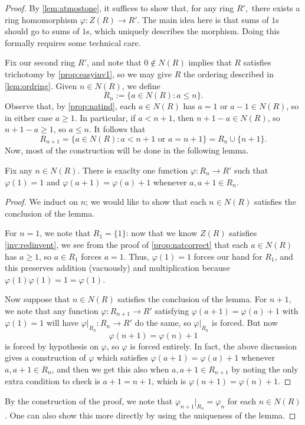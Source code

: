 \documentclass{article}
\begin{document}
\begin{proof}
	By \autoref{lem:atmostone}, it suffices to show that, for any ring $R',$ there exists a ring homomorphism $\varphi:Z(R)\to R'$. The main idea here is that sums of $1$s should go to sums of $1$s, which uniquely describes the morphism. Doing this formally requires some technical care.
	
	Fix our second ring $R'$, and note that $0\notin N(R)$ implies that $R$ satisfies trichotomy by \autoref{prop:easyinv1}, so we may give $R$ the ordering described in \autoref{lem:ordring}. Given $n\in N(R)$, we define
	\[R_n:=\{a\in N(R):a\le n\}.\]
	Observe that, by \autoref{prop:natind}, each $a\in N(R)$ has $a=1$ or $a-1\in N(R)$, so in either case $a\ge1$. In particular, if $a<n+1$, then $n+1-a\in N(R)$, so $n+1-a\ge1$, so $a\le n$. It follows that
	\[R_{n+1}=\{a\in N(R):a<n+1\text{ or }a=n+1\}=R_n\cup\{n+1\}.\]
	Now, most of the construction will be done in the following lemma.
	\begin{lemma}
		Fix any $n\in N(R)$. There is exaclty one function $\varphi:R_n\to R'$ such that $\varphi(1)=1$ and $\varphi(a+1)=\varphi(a)+1$ whenever $a,a+1\in R_n$.
	\end{lemma}
	\begin{proof}
		We induct on $n$; we would like to show that each $n\in N(R)$ satisfies the conclusion of the lemma.
		
		For $n=1$, we note that $R_1=\{1\}$: now that we know $Z(R)$ satisfies \autoref{inv:redinvent}, we see from the proof of \autoref{prop:natcorrect} that each $a\in N(R)$ has $a\ge1$, so $a\in R_1$ forces $a=1$. Thus, $\varphi(1)=1$ forces our hand for $R_1$, and this preserves addition (vacuously) and multiplication because $\varphi(1)\varphi(1)=1=\varphi(1)$.

		Now suppose that $n\in N(R)$ satisfies the conclusion of the lemma. For $n+1$, we note that any function $\varphi:R_{n+1}\to R'$ satisfying $\varphi(a+1)=\varphi(a)+1$ with $\varphi(1)=1$ will have $\varphi|_{R_n}:R_n\to R'$ do the same, so $\varphi|_{R_n}$ is forced. But now
		\[\varphi(n+1)=\varphi(n)+1\]
		is forced by hypothesis on $\varphi$, so $\varphi$ is forced entirely. In fact, the above discussion gives a construction of $\varphi$ which satisfies $\varphi(a+1)=\varphi(a)+1$ whenever $a,a+1\in R_n$, and then we get this also when $a,a+1\in R_{n+1}$ by noting the only extra condition to check is $a+1=n+1$, which is $\varphi(n+1)=\varphi(n)+1$.
	\end{proof}
	By the construction of the proof, we note that $\varphi_{n+1}|_{R_n}=\varphi_n$ for each $n\in N(R)$. One can also show this more directly by using the uniqueness of the lemma.


\end{proof}
\end{document}
